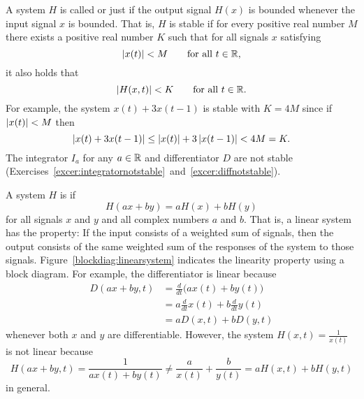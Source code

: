 A system $H$ is called  or just  if the output signal $H(x)$ is bounded whenever the input signal $x$ is bounded.  That is, $H$ is stable if for every positive real number $M$ there exists a positive real number $K$ such that for all signals $x$ satisfying
\[
\left\vert x(t) \right\vert < M \qquad \text{for all $t\in{\mathbb R}$},
\] 
it also holds that
\[
\left\vert H(x,t) \right\vert < K \qquad \text{for all $t\in{\mathbb R}$}.
\]
For example, the system $x(t) + 3 x(t-1)$ is stable with $K = 4M$ since if $\left\vert x(t) \right\vert < M$ then 
\[
\left\vert x(t) + 3 x(t-1) \right\vert \leq \left\vert x(t) \right\vert + 3 \left\vert x(t-1) \right\vert < 4 M = K.
\]
The integrator $I_a$ for any $a \in {\mathbb R}$ and differentiator $D$ are not stable (Exercises~\ref{excer:integratornotstable}~and~\ref{excer:diffnotstable}).

A system $H$ is  if
\[
H( ax + by) = a H(x) + b H(y)
\]
for all signals $x$ and $y$ and all complex numbers $a$ and $b$.  That is, a linear system has the property: If the input consists of a weighted sum of signals, then the output consists of the same weighted sum of the responses of the system to those signals.  Figure~\ref{blockdiag:linearsystem} indicates the linearity property using a block diagram.  For example, the differentiator is linear because
\begin{align*}
D(ax + by,t) &= \frac{d}{dt}\big(ax(t) + by(t)\big) \\
&= a\frac{d}{dt}x(t) + b\frac{d}{dt}y(t) \\
&= aD(x,t) + bD(y,t)
\end{align*}
whenever both $x$ and $y$ are differentiable.  
However, the system $H(x,t) = \frac{1}{x(t)}$ is not linear because
\[
H(ax + by,t) = \frac{1}{ax(t) + by(t)} \neq \frac{a}{x(t)} + \frac{b}{y(t)} = aH(x,t) + bH(y,t)
\]
in general.

